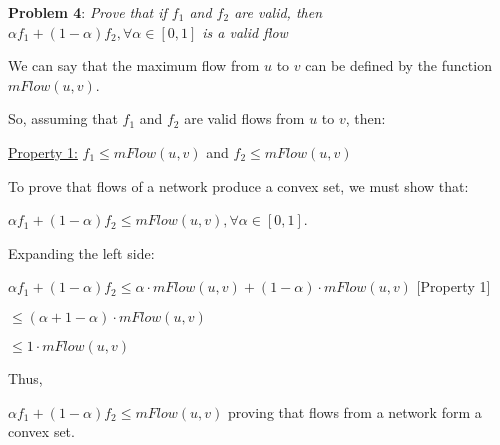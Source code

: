 \documentclass{article} %
\newcommand{\question}[2][]{\begin{flushleft}
        \textbf{Problem #1}: \textit{#2}

\end{flushleft}}
\begin{document}
    \newpage

    \question[4]{Prove that if $f_1$ and $f_2$ are valid, then $\alpha f_1 + (1-\alpha)f_2, \forall \alpha \in [0, 1]$ is a valid flow}

    We can say that the maximum flow from $u$ to $v$ can be defined by the function $mFlow(u, v)$.

    \vspace{5pt}

    So, assuming that $f_1$ and $f_2$ are valid flows from $u$ to $v$, then: 
    
    \underline{Property 1:} $f_1 \leq mFlow(u, v)$ and $f_2 \leq mFlow(u, v)$

    \vspace{5pt}

    To prove that flows of a network produce a convex set, we must show that:

    $\alpha f_1 + (1-\alpha)f_2 \leq mFlow(u, v), \forall \alpha \in [0, 1]$.

    \vspace{5pt}

    Expanding the left side:

    $\alpha f_1 + (1-\alpha)f_2 \leq \alpha \cdot mFlow(u, v) + (1 - \alpha) \cdot mFlow(u, v)$ [Property 1]

    \hspace{2.5cm}$\leq (\alpha + 1 - \alpha) \cdot mFlow(u, v)$

    \hspace{2.5cm}$\leq 1 \cdot mFlow(u, v)$

    Thus, 

    $\alpha f_1 + (1-\alpha)f_2 \leq mFlow(u, v)$ proving that flows from a network form a convex set.
    

    
\end{document}
